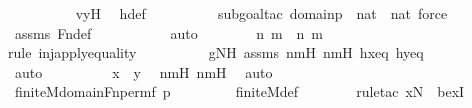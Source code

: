 \begin{isabellebody}
\ \ \ \ \ \ \ \ \isamarkupfalse%
\ vyH\ \isamarkupfalse%
\ h{\isacharunderscore}{\kern0pt}def\ \isanewline
\ \ \ \ \ \ \ \ \isamarkupfalse%
{\isacharparenleft}{\kern0pt}subgoal{\isacharunderscore}{\kern0pt}tac\ {\isachardoublequoteopen}domain{\isacharparenleft}{\kern0pt}p{\isacharparenright}{\kern0pt}\ {\isasymsubseteq}\ nat\ {\isasymtimes}\ nat{\isachardoublequoteclose}{\isacharcomma}{\kern0pt}\ force{\isacharparenright}{\kern0pt}\isanewline
\ \ \ \ \ \ \ \ \isamarkupfalse%
\ assms\ Fn{\isacharunderscore}{\kern0pt}def\ \isanewline
\ \ \ \ \ \ \ \ \isamarkupfalse%
\ auto\isanewline
\isanewline
\ \ \ \ \ \ \isamarkupfalse%
\ {\isachardoublequoteopen}{\isacharless}{\kern0pt}n{\isacharcomma}{\kern0pt}\ m{\isachargreater}{\kern0pt}\ {\isacharequal}{\kern0pt}\ {\isacharless}{\kern0pt}n{\isacharprime}{\kern0pt}{\isacharcomma}{\kern0pt}\ m{\isacharprime}{\kern0pt}{\isachargreater}{\kern0pt}{\isachardoublequoteclose}\ \isanewline
\ \ \ \ \ \ \ \ \isamarkupfalse%
{\isacharparenleft}{\kern0pt}rule\ inj{\isacharunderscore}{\kern0pt}apply{\isacharunderscore}{\kern0pt}equality{\isacharparenright}{\kern0pt}\isanewline
\ \ \ \ \ \ \ \ \isamarkupfalse%
\ gNH\ assms{}\ nmH\ n{\isacharprime}{\kern0pt}m{\isacharprime}{\kern0pt}H\ hxeq\ hyeq\ \isanewline
\ \ \ \ \ \ \ \ \isamarkupfalse%
\ auto\isanewline
\ \ \ \ \ \ \isamarkupfalse%
\ \isamarkupfalse%
\ {\isachardoublequoteopen}x\ {\isacharequal}{\kern0pt}\ y{\isachardoublequoteclose}\ \isamarkupfalse%
\ nmH\ n{\isacharprime}{\kern0pt}m{\isacharprime}{\kern0pt}H\ \isamarkupfalse%
\ auto\isanewline
\ \ \ \ \isamarkupfalse%
\isanewline
\isanewline
\ \ \ \ \isamarkupfalse%
\ \isamarkupfalse%
\ {\isachardoublequoteopen}finite{\isacharunderscore}{\kern0pt}M{\isacharparenleft}{\kern0pt}domain{\isacharparenleft}{\kern0pt}Fn{\isacharunderscore}{\kern0pt}perm{\isacharparenleft}{\kern0pt}f{\isacharcomma}{\kern0pt}\ p{\isacharparenright}{\kern0pt}{\isacharparenright}{\kern0pt}{\isacharparenright}{\kern0pt}{\isachardoublequoteclose}\ \isanewline
\ \ \ \ \ \ \isamarkupfalse%
\ finite{\isacharunderscore}{\kern0pt}M{\isacharunderscore}{\kern0pt}def\ \isanewline
\ \ \ \ \ \ \isamarkupfalse%
{\isacharparenleft}{\kern0pt}rule{\isacharunderscore}{\kern0pt}tac\ x{\isacharequal}{\kern0pt}N\ \ bexI{\isacharparenright}{\kern0pt}\isanewline

\end{isabellebody}
